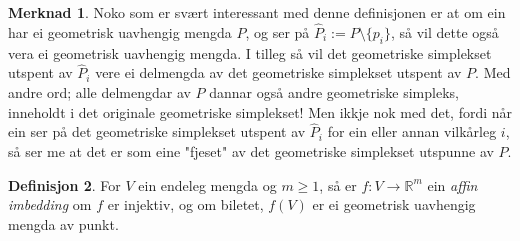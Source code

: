 \documentclass[a4paper, titlepage, 12pt, norsk]{article}
\theoremstyle{plain}
\newtheorem{theorem}{Teorem}[section]
\theoremstyle{definition}
\newtheorem{definition}[theorem]{Definisjon}
\newtheorem{remark}[theorem]{Merknad}
\newcommand{\Rb}{\mathbb{R}}
\newcommand{\intersect}{ \mathop{\cap}\limits } %
\begin{document}
\begin{remark}
	Noko som er svært interessant med denne definisjonen er at om ein har ei geometrisk uavhengig mengda $P$, og ser på $\hat{P}_i := P \setminus \{p_i\}$, så vil dette også vera ei geometrisk uavhengig mengda. I tilleg så vil det geometriske simplekset utspent av $\hat{P}_i$ vere ei delmengda av det geometriske simplekset utspent av $P$. Med andre ord; alle delmengdar av $P$ dannar også andre geometriske simpleks, inneholdt i det originale geometriske simplekset! Men ikkje nok med det, fordi når ein ser på det geometriske simplekset utspent av $\hat{P}_i$ for ein eller annan vilkårleg $i$, så ser me at det er som eine "fjeset" av det geometriske simplekset utspunne av $P$. 
\end{remark}




\begin{definition}
	For $V$ ein endeleg mengda og $m\geq1$, så er $f:V\rightarrow \Rb^m$ ein \emph{affin imbedding} om $f$ er injektiv, og om biletet, $f(V)$ er ei geometrisk uavhengig mengda av punkt.
\end{definition}
\end{document}
